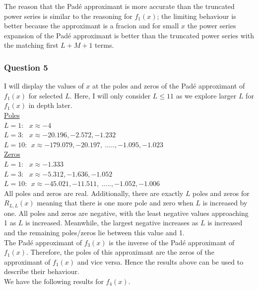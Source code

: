 \documentclass[12pt, a4paper]{article}
\begin{document}
The reason that the Pad\'e approximant is more accurate than the truncated power series is similar
to the reasoning for $f_{1}(x)$; the limiting behaviour is better because the approximant 
is a fracion and for small $x$ the power series expansion of the Pad\'e approximant is better
than the truncated power series with the matching first $L + M + 1$ terms.

\subsubsection*{Question 5}

I will display the values of $x$ at the poles and zeros of the Pad\'e approximant of $f_{1}(x)$ for 
selected $L$. Here, I will only consider $L\leq11$ as we explore larger $L$ for $f_{1}(x)$ in depth
later.\\
\underline{Poles}\\
$L = 1: ~~~ x \approx -4$\\
$L = 3: ~~~ x \approx -20.196, -2.572, -1.232$\\
$L = 10: ~~ x \approx -179.079, -20.197,~....., -1.095, -1.023$\\
\underline{Zeros}\\
$L = 1: ~~~ x \approx -1.333$\\ 
$L = 3: ~~~ x \approx -5.312, -1.636, -1.052$\\
$L = 10: ~~ x \approx -45.021, -11.511,~.....,  -1.052, -1.006$
\\

All poles and zeros are real. Additionally, there are exactly $L$ poles and zeros for $R_{L,L}(x)$ meaning
that there is one more pole and zero when $L$ is increased by one. All poles and zeros are negative, with
the least negative values approaching 1 as $L$ is increased. Meanwhile, the largest negative increases as
$L$ is increased and the remaining poles/zeros lie between this value and 1.
\\

The Pad\'e approximant of $f_{3}(x)$ is the inverse of the Pad\'e approximant of $f_{1}(x)$. Therefore, the
poles of this approximant are the zeros of the approximant of $f_{1}(x)$ and vice versa. Hence the results
above can be used to describe their behaviour.
\\

We have the following results for $f_{4}(x)$.
\end{document}
